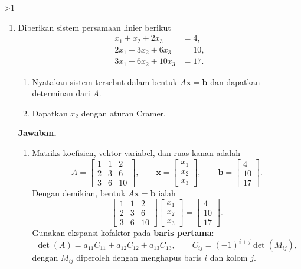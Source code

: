 \documentclass[12pt]{article}
\newcommand{\answername}{Jawaban}
\newenvironment{soaljawab}[1]{%
    \ifnum#1>1\clearpage\fi
    \begin{tcolorbox}[enhanced,breakable,height fill,height fixed for=all,
        sharp corners,colback=white,colframe=black,boxrule=0.4bp,
        boxsep=0pt,left=12bp,right=12bp,top=6bp,bottom=10bp,
        before skip=0pt,after skip=0pt,pad at break=8bp]
    \fontsize{12bp}{14bp}\selectfont
    \setlength{\abovedisplayskip}{8bp}
    \setlength{\belowdisplayskip}{8bp}
    \setlength{\abovedisplayshortskip}{8bp}
    \setlength{\belowdisplayshortskip}{8bp}
    \renewcommand{\arraystretch}{1.15}
    \begin{enumerate}[start=#1,topsep=0pt]
}{%
    \end{enumerate}
    \end{tcolorbox}
}
\newcommand{\jawaban}{\par\medskip\textbf{\answername.}\par\smallskip}
\begin{document}
\begin{soaljawab}{5}
\item Diberikan sistem persamaan linier berikut
        \[
          \begin{aligned}
            x_1 + x_2 + 2x_3    & = 4,  \\
            2x_1 + 3x_2 + 6x_3  & = 10, \\
            3x_1 + 6x_2 + 10x_3 & = 17.
          \end{aligned}
        \]
        \begin{enumerate}
          \item Nyatakan sistem tersebut dalam bentuk $A\mathbf{x} = \mathbf{b}$ dan dapatkan determinan dari $A$.
          \item Dapatkan $x_2$ dengan aturan Cramer.
        \end{enumerate}
\jawaban
\begin{enumerate}
\item Matriks koefisien, vektor variabel, dan ruas kanan adalah
\[
    A=\begin{bmatrix}1&1&2\\2&3&6\\3&6&10\end{bmatrix},\qquad
    \mathbf{x}=\begin{bmatrix}x_1\\x_2\\x_3\end{bmatrix},\qquad
    \mathbf{b}=\begin{bmatrix}4\\10\\17\end{bmatrix}.
\]
Dengan demikian, bentuk $A\mathbf{x}=\mathbf{b}$ ialah
\[
    \begin{bmatrix}1&1&2\\2&3&6\\3&6&10\end{bmatrix}
    \begin{bmatrix}x_1\\x_2\\x_3\end{bmatrix}
    =\begin{bmatrix}4\\10\\17\end{bmatrix}.
\]
Gunakan ekspansi kofaktor pada \textbf{baris pertama}:
\[
    \det(A)=a_{11}C_{11}+a_{12}C_{12}+a_{13}C_{13},\qquad
    C_{ij}=(-1)^{i+j}\det(M_{ij}),
\]
dengan $M_{ij}$ diperoleh dengan menghapus baris $i$ dan kolom $j$.

\end{enumerate}
\end{soaljawab}
\end{document}
